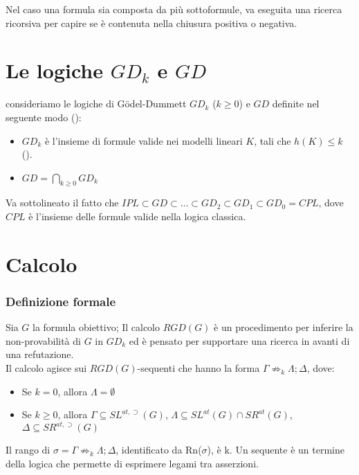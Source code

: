 \documentclass[\main/tesi.tex]{subfiles}
\begin{document}
Nel caso una formula sia composta da più sottoformule, va eseguita una ricerca ricorsiva per capire se è contenuta nella chiusura positiva o negativa. \\

\section{Le logiche $GD_k$ e $GD$}

consideriamo le logiche di G\"odel-Dummett $GD_k$ ($k \geq 0$) e $GD$ definite nel seguente modo (\cite{ChaZak:97}):
\begin{itemize}
    \item $GD_k$ è l'insieme di formule valide nei modelli lineari $K$, tali che $h(K) \leq k$ (\cite[pp.\ 2--3]{DBLP:conf/cilc/Fiorentini022}).
    \item $GD = \bigcap_{k \geq 0}GD_k$
\end{itemize}
Va sottolineato il fatto che $IPL \subset GD \subset \dots \subset GD_2 \subset GD_1 \subset GD_0 = CPL$, dove $CPL$ è l'insieme delle formule valide nella logica classica.

\section{Calcolo}

\subsubsection{Definizione formale}
Sia $G$ la formula obiettivo; Il calcolo $RGD(G)$ è un procedimento per inferire la non-provabilità di $G$ in $GD_k$ ed è pensato per supportare una ricerca in avanti di una refutazione.\\
Il calcolo agisce sui $RGD(G)$-sequenti che hanno la forma $\Gamma \not\Rightarrow_k \Lambda; \Delta$, dove:
\begin{itemize}
    \item Se $k = 0$, allora $\Lambda = \emptyset$
    \item Se $k \geq 0$, allora $\Gamma \subseteq SL^{at,\supset}(G)$, $\Lambda \subseteq SL^{at}(G) \cap SR^{at}(G)$, $\Delta \subseteq SR^{at,\supset}(G)$
\end{itemize}
Il rango di $\sigma = \Gamma \not\Rightarrow_k \Lambda; \Delta$, identificato da Rn($\sigma$), è k. Un sequente è un termine della logica che permette di esprimere legami tra asserzioni.
\end{document}
